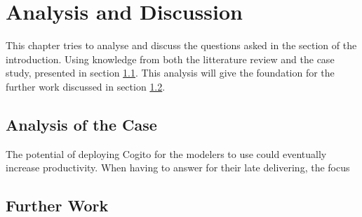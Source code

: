 \chapter{Analysis and Discussion}
This chapter tries to analyse and discuss the questions asked in the  section of the introduction. Using knowledge from both the litterature review and the case study, presented in section \ref{sec:analysis}. This analysis will give the foundation for the further work discussed in section \ref{sec:further_work}. 
\section{Analysis of the Case} \label{sec:analysis}

The potential of deploying Cogito for the modelers to use could eventually increase productivity. When having to answer for their late delivering, the focus  

\section{Further Work} \label{sec:further_work}

\cleardoublepage